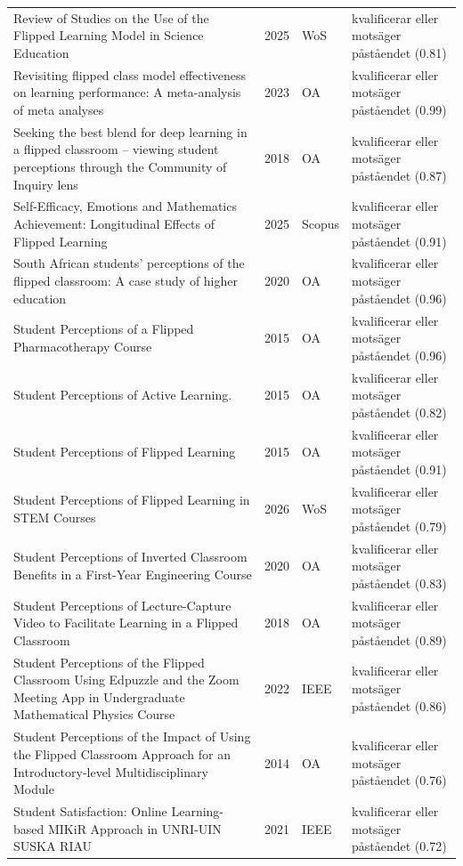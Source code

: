 \begin{longtable}{@{}%
  >{\raggedright\arraybackslash}p{}c%
  >{\raggedright\arraybackslash}p{}%
  >{\raggedright\arraybackslash}p{}@{}}
Review of Studies on the Use of the Flipped Learning Model in Science Education & 2025 & WoS & kvalificerar eller motsäger påståendet (0.81) \\
Revisiting flipped class model effectiveness on learning performance: A meta-analysis of meta analyses & 2023 & OA & kvalificerar eller motsäger påståendet (0.99) \\
Seeking the best blend for deep learning in a flipped classroom -- viewing student perceptions through the Community of Inquiry lens & 2018 & OA & kvalificerar eller motsäger påståendet (0.87) \\
Self-Efficacy, Emotions and Mathematics Achievement: Longitudinal Effects of Flipped Learning & 2025 & Scopus & kvalificerar eller motsäger påståendet (0.91) \\
South African students' perceptions of the flipped classroom: A case study of higher education & 2020 & OA & kvalificerar eller motsäger påståendet (0.96) \\
Student Perceptions of a Flipped Pharmacotherapy Course & 2015 & OA & kvalificerar eller motsäger påståendet (0.96) \\
Student Perceptions of Active Learning. & 2015 & OA & kvalificerar eller motsäger påståendet (0.82) \\
Student Perceptions of Flipped Learning & 2015 & OA & kvalificerar eller motsäger påståendet (0.91) \\
Student Perceptions of Flipped Learning in STEM Courses & 2026 & WoS & kvalificerar eller motsäger påståendet (0.79) \\
Student Perceptions of Inverted Classroom Benefits in a First-Year Engineering Course & 2020 & OA & kvalificerar eller motsäger påståendet (0.83) \\
Student Perceptions of Lecture-Capture Video to Facilitate Learning in a Flipped Classroom & 2018 & OA & kvalificerar eller motsäger påståendet (0.89) \\
Student Perceptions of the Flipped Classroom Using Edpuzzle and the Zoom Meeting App in Undergraduate Mathematical Physics Course & 2022 & IEEE & kvalificerar eller motsäger påståendet (0.86) \\
Student Perceptions of the Impact of Using the Flipped Classroom Approach for an Introductory-level Multidisciplinary Module & 2014 & OA & kvalificerar eller motsäger påståendet (0.76) \\
Student Satisfaction: Online Learning-based MIKiR Approach in UNRI-UIN SUSKA RIAU & 2021 & IEEE & kvalificerar eller motsäger påståendet (0.72) \\

\end{longtable}
